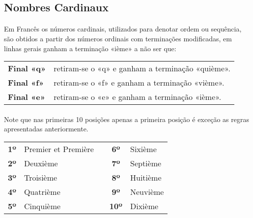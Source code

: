 \documentclass{article}
\begin{document}
    \subsection{Nombres Cardinaux}
        \paragraph{}Em Francês os números cardinais, utilizados para denotar ordem ou sequência, são obtidos a partir dos números ordinais com terminações modificadas, em linhas gerais ganham a terminação «ième» a não ser que:

            \begin{center}
                \begin{tabular}{l l}
                    \textbf{Final «q»} & retiram-se o «q» e ganham a terminação «quième».\\
                    \textbf{Final «f»} & retiram-se o «f» e ganham a terminação «vième».\\
                    \textbf{Final «e»} & retiram-se o «e» e ganham a terminação «ième».\\
                \end{tabular}
            \end{center} 

        \paragraph{}Note que nas primeiras 10 posições apenas a primeira posição é exceção as regras apresentadas anteriormente.
            
            \begin{center}
                \begin{tabular}{c l c c l}
                    \textbf{1º} & Premier et Première &  & \textbf{6º}  & Sixième\\
                    \textbf{2º} & Deuxième            &  & \textbf{7º}  & Septième\\
                    \textbf{3º} & Troisième           &  & \textbf{8º}  & Huitième\\
                    \textbf{4º} & Quatrième           &  & \textbf{9º}  & Neuvième\\
                    \textbf{5º} & Cinquième           &  & \textbf{10º} & Dixième\\
                \end{tabular}
            \end{center} 
        
\end{document}
